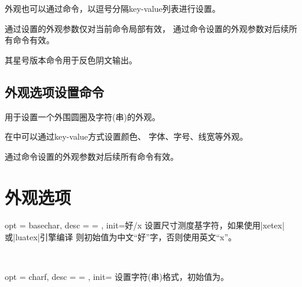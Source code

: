 \documentclass[full]{l3doc}
\begin{document}
\begin{documentation}
  外观也可以通过命令，以逗号分隔key-value列表进行设置。

  通过设置的外观参数仅对当前命令局部有效，
  通过命令设置的外观参数对后续所有命令有效。

  其星号版本命令用于反色阴文输出。

\begin{SideBySideExample}[frame=single,numbers=left,xrightmargin=.45\linewidth,gobble=2]
  \centering
  \quad
  \quad
  \quad
\end{SideBySideExample}

\subsection{外观选项设置命令}

\begin{function}{\circledtextset}
  \begin{syntax}
     
  \end{syntax}
\end{function}

  用于设置一个外围圆圈及字符(串)的外观。

  在中可以通过key-value方式设置颜色、
  字体、字号、线宽等外观。

  通过命令设置的外观参数对后续所有命令有效。

\section{外观选项}

\begin{option}{ opt = basechar, desc = {= }, init=好/x }
  设置尺寸测度基字符，如果使用|xetex|或|luatex|引擎编译
  则初始值为中文“好”字，否则使用英文``x''。
\end{option}\\
\begin{SideBySideExample}[frame=single,numbers=left,xrightmargin=.45\linewidth,gobble=2]
  \centering
  \quad
  \quad
\end{SideBySideExample}

\bigskip

\begin{option}{ opt = charf, desc = {= }, init= }
  设置字符(串)格式，初始值为。
\end{option}\\
\begin{SideBySideExample}[frame=single,numbers=left,xrightmargin=.45\linewidth,gobble=2]
  \centering
  \qquad
\end{SideBySideExample}


\end{documentation}
\end{document}
